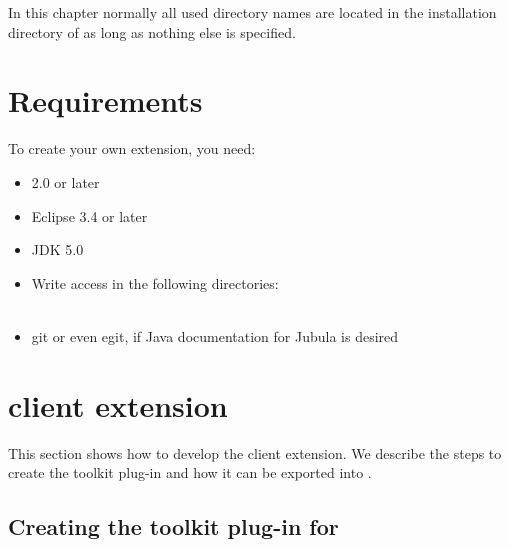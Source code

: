 In this chapter normally all used directory names are located in the
installation directory of \app{} as long as nothing else is specified.

\section{Requirements}
To create your own \app{} extension, you need:
\begin{itemize}
\item \app{} 2.0 or later
\item Eclipse 3.4 or later
\item JDK 5.0
\item Write access in the following directories:\\
\\
\item git or even egit, if Java documentation for Jubula is desired
\end{itemize}

\section{\app{} client extension}
\label{clientExtension}

This section shows how to develop the \app{} client extension. We describe the
steps to create the toolkit plug-in and how it can be exported into \app{}.

\subsection{Creating the toolkit plug-in for \app{}}


